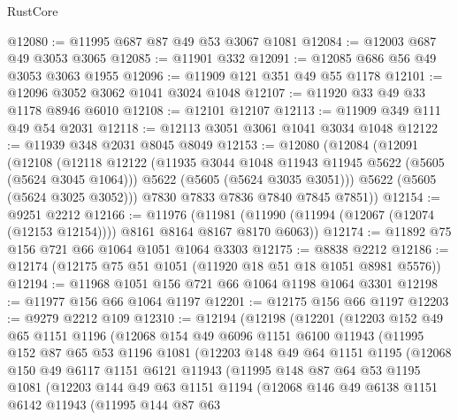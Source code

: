 \begin{lexlean}{RustCore}
\begin{coremodule}
@12080 := @11995 @687 @87 @49 @53 @3067 @1081
@12084 := @12003 @687 @49 @3053 @3065
@12085 := @11901 @332
@12091 := @12085 @686 @56 @49 @3053 @3063 @1955
@12096 := @11909 @121 @351 @49 @55 @1178
@12101 := @12096 @3052 @3062 @1041 @3024 @1048
@12107 := @11920 @33 @49 @33 @1178 @8946 @6010
@12108 := @12101 @12107
@12113 := @11909 @349 @111 @49 @54 @2031
@12118 := @12113 @3051 @3061 @1041 @3034 @1048
@12122 := @11939 @348 @2031 @8045 @8049
@12153 := @12080
    (@12084
      (@12091
        (@12108
          (@12118
            @12122
            (@11935 @3044 @1048 @11943 @11945 @5622 (@5605 (@5624 @3045 @1064)))
            @5622
            (@5605 (@5624 @3035 @3051)))
          @5622
          (@5605 (@5624 @3025 @3052)))
        @7830
        @7833
        @7836
        @7840
        @7845
        @7851))
@12154 := @9251 @2212
@12166 := @11976
    (@11981 (@11990 (@11994 (@12067 (@12074 (@12153 @12154)))) @8161 @8164 @8167 @8170 @6063))
@12174 := @11892 @75 @156 @721 @66 @1064 @1051 @1064 @3303
@12175 := @8838 @2212
@12186 := @12174 (@12175 @75 @51 @1051 (@11920 @18 @51 @18 @1051 @8981 @5576))
@12194 := @11968 @1051 @156 @721 @66 @1064 @1198 @1064 @3301
@12198 := @11977 @156 @66 @1064 @1197
@12201 := @12175 @156 @66 @1197
@12203 := @9279 @2212 @109
@12310 := @12194
    (@12198
      (@12201
        (@12203
          @152
          @49
          @65
          @1151
          @1196
          (@12068
            @154
            @49
            @6096
            @1151
            @6100
            @11943
            (@11995
              @152
              @87
              @65
              @53
              @1196
              @1081
              (@12203
                @148
                @49
                @64
                @1151
                @1195
                (@12068
                  @150
                  @49
                  @6117
                  @1151
                  @6121
                  @11943
                  (@11995
                    @148
                    @87
                    @64
                    @53
                    @1195
                    @1081
                    (@12203
                      @144
                      @49
                      @63
                      @1151
                      @1194
                      (@12068
                        @146
                        @49
                        @6138
                        @1151
                        @6142
                        @11943
                        (@11995
                          @144
                          @87
                          @63

\end{coremodule}
\end{lexlean}
